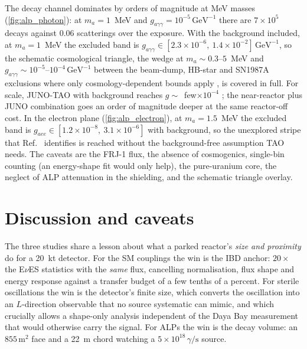 \documentclass[aps,prd,superscriptaddress,nofootinbib,longbibliography,notitlepage,11pt]{revtex4-2}
\newcommand{\eves}{E$\nu$ES}
\begin{document}
The decay channel dominates by orders of magnitude at MeV masses (\cref{fig:alp_photon}):
at $m_a=1$~MeV and $g_{a\gamma\gamma}=10^{-5}\,\mathrm{GeV^{-1}}$ there are $7\times10^5$
decays against $0.06$ scatterings over the exposure.  With the background included, at
$m_a=1$~MeV the excluded band is
$g_{a\gamma\gamma}\in[2.3\times10^{-6},\ 1.4\times10^{-2}]\,\mathrm{GeV^{-1}}$, so the
schematic cosmological triangle, the wedge at $m_a\sim0.3$--$5$~MeV and
$g_{a\gamma\gamma}\sim10^{-5}$--$10^{-4}\,\mathrm{GeV^{-1}}$ between the beam-dump, HB-star
and SN1987A exclusions where only cosmology-dependent bounds apply
\cite{Depta:2020wmr,Jaeckel:2006xm}, is covered in full.  For scale, JUNO-TAO with
background reaches $g\sim$~few$\times10^{-4}$ \cite{AristizabalSierra:2025myf}; the
near-reactor plus JUNO combination goes an order of magnitude deeper at the same reactor-off
cost.  In the electron plane (\cref{fig:alp_electron}), at $m_a=1.5$~MeV the excluded band
is $g_{aee}\in[1.2\times10^{-8},\ 3.1\times10^{-6}]$ with background, so the unexplored
stripe that Ref.~\cite{AristizabalSierra:2025myf} identifies is reached without the
background-free assumption TAO needs.  The caveats are the FRJ-1 flux, the absence of
cosmogenics, single-bin counting (an energy-shape fit would only help), the pure-uranium
core, the neglect of ALP attenuation in the shielding, and the schematic triangle overlay.

\section{Discussion and caveats}
\label{sec:discussion}

The three studies share a lesson about what a parked reactor's \emph{size and proximity}
do for a 20~kt detector.  For the SM couplings the win is the IBD anchor: $20\times$ the
\eves{} statistics with the \emph{same} flux, cancelling normalisation, flux shape and
energy response against a transfer budget of a few tenths of a percent.  For sterile oscillations the win is
the detector's finite size, which converts the oscillation into an $L$-direction
observable that no source systematic can mimic, and which crucially allows a shape-only
analysis independent of the Daya Bay measurement that would otherwise carry the signal.  For
ALPs the win is the decay volume: an $855\,\mathrm{m^2}$ face and a 22~m chord watching a
$5\times10^{18}\,\gamma/\mathrm{s}$ source.
\end{document}
